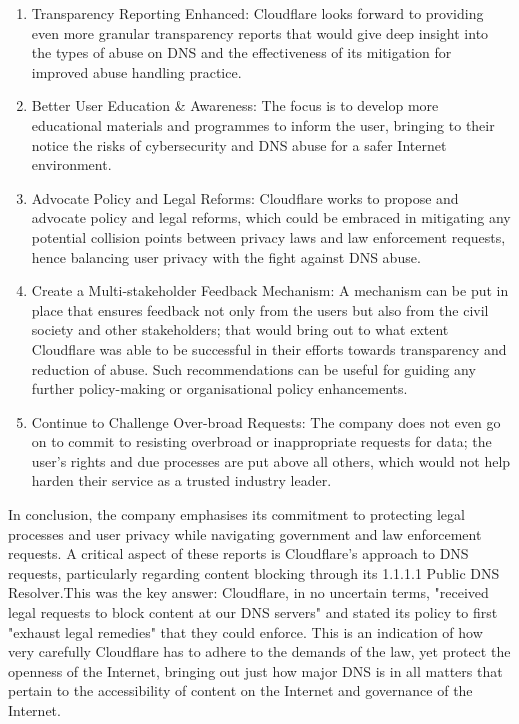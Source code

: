 \begin{enumerate}
\begin{enumerate}
    \item Transparency Reporting Enhanced: Cloudflare looks forward to providing even more granular transparency reports that would give deep insight into the types of abuse on DNS and the effectiveness of its mitigation for improved abuse handling practice.

    \item Better User Education \& Awareness: The focus is to develop more educational materials and programmes to inform the user, bringing to their notice the risks of cybersecurity and DNS abuse for a safer Internet environment.


    \item Advocate Policy and Legal Reforms: Cloudflare works to propose and advocate policy and legal reforms, which could be embraced in mitigating any potential collision points between privacy laws and law enforcement requests, hence balancing user privacy with the fight against DNS abuse.
    
    \item Create a Multi-stakeholder Feedback Mechanism: A mechanism can be put in place that ensures feedback not only from the users but also from the civil society and other stakeholders; that would bring out to what extent Cloudflare was able to be successful in their efforts towards transparency and reduction of abuse. Such recommendations can be useful for guiding any further policy-making or organisational policy enhancements.
    
    \item Continue to Challenge Over-broad Requests: The company does not even go on to commit to resisting overbroad or inappropriate requests for data; the user's rights and due processes are put above all others, which would not help harden their service as a trusted industry leader.

    
    
\end{enumerate}

In conclusion, the company emphasises its commitment to protecting legal processes and user privacy while navigating government and law enforcement requests. A critical aspect of these reports is Cloudflare's approach to DNS requests, particularly regarding content blocking through its 1.1.1.1 Public DNS Resolver.This was the key answer: Cloudflare, in no uncertain terms, "received legal requests to block content at our DNS servers" and stated its policy to first "exhaust legal remedies" that they could enforce. This is an indication of how very carefully Cloudflare has to adhere to the demands of the law, yet protect the openness of the Internet, bringing out just how major DNS is in all matters that pertain to the accessibility of content on the Internet and governance of the Internet.


\end{enumerate}
